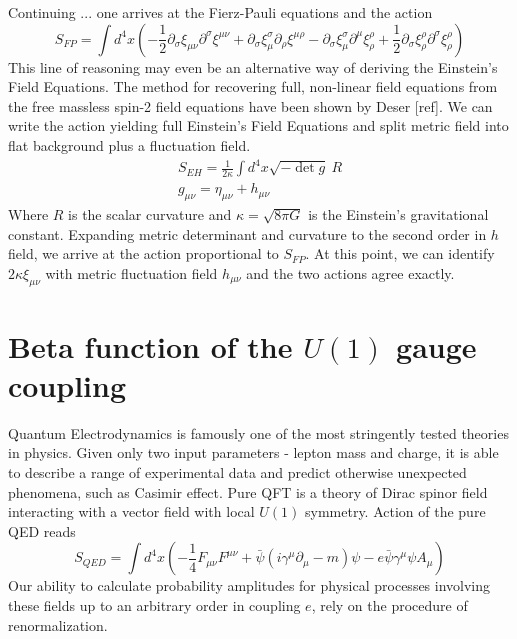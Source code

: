 \documentclass[11pt, a4paper]{article}
\begin{document}
Continuing ... one arrives at the Fierz-Pauli equations and the action
\begin{equation}
    S_{FP} = \int d^4 x \left( -\frac{1}{2} \partial_\sigma \xi_{\mu\nu} \partial^\sigma \xi^{\mu\nu} +  \partial_\sigma \xi_\mu^\sigma \partial_\rho \xi^{\mu\rho} - \partial_\sigma \xi_\mu^\sigma \partial^\mu \xi_\rho^\rho +\frac{1}{2} \partial_\sigma \xi_\rho^\rho \partial^\sigma \xi_\rho^\rho \right)
    \label{SFP}
\end{equation}
This line of reasoning may even be an alternative way of deriving the Einstein's Field Equations. The method for recovering full, non-linear
field equations from the free massless spin-2 field equations have been shown by Deser [ref]. 
We can write the action yielding full Einstein's Field Equations and split metric field into flat background plus a fluctuation field.
\begin{gather}
    S_{EH} = \frac{1}{2 \kappa} \int d^4 x \sqrt{-\det{g}} \ R \\
    g_{\mu\nu} = \eta_{\mu\nu} + h_{\mu\nu}
    \label{SEH}
\end{gather}
Where $R$ is the scalar curvature and $\kappa = \sqrt{8 \pi G}$ is the Einstein's gravitational constant. Expanding metric determinant and curvature to the second order in $h$ field, we arrive at the action proportional to $S_{FP}$.
At this point, we can identify $2\kappa\xi_{\mu\nu}$ with metric fluctuation field $h_{\mu\nu}$ and the two actions agree exactly.


\section{Beta function of the $U(1)$ gauge coupling}
Quantum Electrodynamics is famously one of the most stringently tested theories in physics. Given only two input
parameters - lepton mass and charge, it is able to describe a range of experimental data and predict otherwise
unexpected phenomena, such as Casimir effect. Pure QFT is a theory of Dirac spinor field interacting with a vector field with local $U(1)$ symmetry.
Action of the pure QED reads
\begin{equation}
    S_{QED} = \int d^4 x \left( -\frac{1}{4}F_{\mu\nu}F^{\mu\nu} + \bar{\psi}(i \gamma^\mu \partial_\mu - m)\psi - e \bar{\psi} \gamma^\mu \psi A_\mu \right)
\end{equation}
Our ability to calculate probability amplitudes for physical processes involving these fields up to an arbitrary order in coupling $e$,
rely on the procedure of renormalization. 
\end{document}
